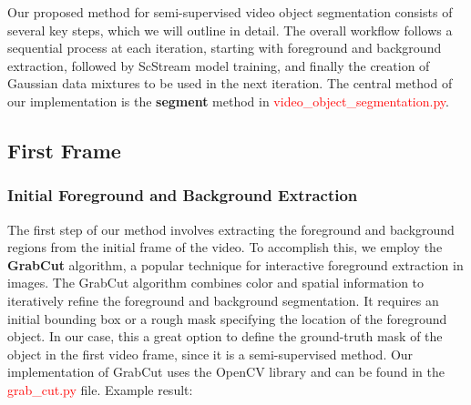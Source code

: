 Our proposed method for semi-supervised video object segmentation consists of several key steps, which we will outline in detail.
The overall workflow follows a sequential process at each iteration, starting with foreground and background extraction,
followed by ScStream model training, and finally the creation of Gaussian data mixtures to be used in the next iteration.
The central method of our implementation is the \textbf{segment} method in \textcolor{red}{video\_object\_segmentation.py}.
\subsection{First Frame}\label{subsec:first-frame}
\subsubsection{Initial Foreground and Background Extraction}\label{subsubsec:initial-foreground-and-background-extraction}
The first step of our method involves extracting the foreground and background regions from the initial frame of the video.
To accomplish this, we employ the \textbf{GrabCut} algorithm, a popular technique for interactive foreground extraction in images.
The GrabCut algorithm combines color and spatial information to iteratively refine the foreground and background segmentation.
It requires an initial bounding box or a rough mask specifying the location of the foreground object.
In our case, this a great option to define the ground-truth mask of the object in the first video frame, since it is a semi-supervised method.
Our implementation of GrabCut uses the OpenCV library and can be found in the \textcolor{red}{grab\_cut.py} file.
Example result:
